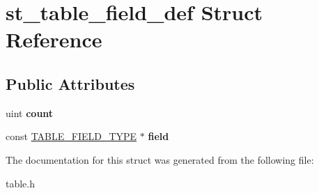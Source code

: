 \hypertarget{structst__table__field__def}{}\section{st\+\_\+table\+\_\+field\+\_\+def Struct Reference}
\label{structst__table__field__def}
\subsection*{Public Attributes}
\begin{DoxyCompactItemize}
\item 
\mbox{\label{structst__table__field__def_ae643429fd04dd803fb22fed5aef968eb}} 
uint {\bfseries count}
\item 
\mbox{\label{structst__table__field__def_a614ce7db850e19e59a6c89fe988b379f}} 
const \mbox{\hyperlink{structst__table__field__type}{T\+A\+B\+L\+E\+\_\+\+F\+I\+E\+L\+D\+\_\+\+T\+Y\+PE}} $\ast$ {\bfseries field}
\end{DoxyCompactItemize}


The documentation for this struct was generated from the following file\+:\begin{DoxyCompactItemize}
\item 
table.\+h\end{DoxyCompactItemize}
